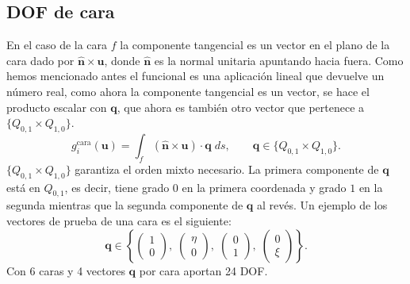 \documentclass[12pt]{report} %
\begin{document}
\subsection{DOF de cara}\label{subsec:dof-cara}
En el caso de la cara $f$  la componente tangencial es un vector en el plano de la cara dado por $\hat{\mathbf{n}}\times\mathbf{u}$, donde $\hat{\mathbf{n}}$ es la normal unitaria apuntando hacia fuera.
Como hemos mencionado antes el funcional es una aplicación lineal que devuelve un número real, como ahora la componente tangencial es un vector, se hace el producto escalar con $\mathbf{q}$, que ahora es también otro vector que pertenece a $\{Q_{0,1}\times Q_{1,0}\}$.
\begin{equation}\label{eq:dof-cara}
	g_i^{\text{cara}}(\mathbf{u}) = \int_{f} (\hat{\mathbf{n}}\times\mathbf{u})\cdot \mathbf{q} \; ds,
	\qquad \mathbf{q}\in\{Q_{0,1}\times Q_{1,0}\}.
\end{equation}
$\{Q_{0,1}\times Q_{1,0}\}$ garantiza el orden mixto necesario. La primera componente de $\mathbf{q}$ est\'a en $Q_{0,1}$, es decir, tiene grado $0$ en la primera coordenada y grado $1$ en la segunda mientras que la segunda componente de $\mathbf{q}$ al revés. Un ejemplo de los vectores de prueba de una cara es el siguiente:
\begin{equation*}
	\mathbf{q}\in\left\{
	\begin{pmatrix} 1 \\ 0 \end{pmatrix},\;
	\begin{pmatrix} \eta \\ 0 \end{pmatrix},\;
	\begin{pmatrix} 0 \\ 1 \end{pmatrix},\;
	\begin{pmatrix} 0 \\ \xi \end{pmatrix}
	\right\}.
\end{equation*}
Con 6 caras y 4 vectores $\mathbf{q}$ por cara aportan 24 DOF.
\end{document}
